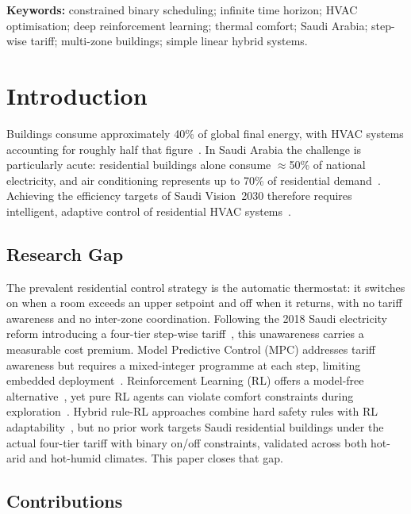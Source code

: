 \documentclass[12pt,a4paper]{article}
\let\oldsection\section
\renewcommand{\section}[1]{\FloatBarrier\oldsection{#1}}
\let\oldsubsection\subsection
\renewcommand{\subsection}[1]{\FloatBarrier\oldsubsection{#1}}
\begin{document}
\noindent\textbf{Keywords:} constrained binary scheduling; infinite time horizon; HVAC
optimisation; deep reinforcement learning; thermal comfort; Saudi Arabia;
step-wise tariff; multi-zone buildings; simple linear hybrid systems.

\section{Introduction}
\label{sec:intro}

Buildings consume approximately 40\% of global final energy, with HVAC
systems accounting for roughly half that figure~\cite{PerezLombard2008}.
In Saudi Arabia the challenge is particularly acute: residential buildings
alone consume $\approx$50\% of national electricity, and air conditioning
represents up to 70\% of residential demand~\cite{AlHomoud2021,Krarti2020}.
Achieving the efficiency targets of Saudi Vision~2030 therefore requires
intelligent, adaptive control of residential HVAC systems~\cite{Belaid2025}.

\subsection{Research Gap}

The prevalent residential control strategy is the automatic thermostat:
it switches on when a room exceeds an upper setpoint and off when it
returns, with no tariff awareness and no inter-zone coordination.
Following the 2018 Saudi electricity reform introducing a four-tier
step-wise tariff~\cite{Nahiduzzaman2023}, this unawareness carries a
measurable cost premium.
Model Predictive Control (MPC) addresses tariff awareness but requires a
mixed-integer programme at each step, limiting embedded
deployment~\cite{Risbeck2017}.
Reinforcement Learning (RL) offers a model-free alternative~\cite{AlSayed2024,Biemann2021,Azuatalam2020},
yet pure RL agents can violate comfort constraints during
exploration~\cite{Xu2025}.
Hybrid rule-RL approaches combine hard safety rules with RL
adaptability~\cite{Xu2025,Solinas2024}, but no prior work targets Saudi
residential buildings under the actual four-tier tariff with binary
on/off constraints, validated across both hot-arid and hot-humid climates.
This paper closes that gap.

\subsection{Contributions}
\end{document}
